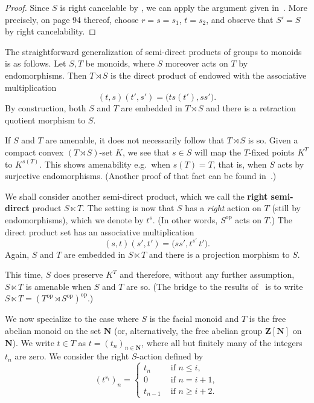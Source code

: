 \documentclass[12pt, pdflatex]{amsart}
\theoremstyle{definition}
\numberwithin{equation}{section}
\numberwithin{theorem}{section}
\newcommand{\NN}{\mathbf{N}}
\newcommand{\ZZ}{\mathbf{Z}}
\begin{document}
\begin{proof}
Since $S$ is right cancelable by , we can apply the argument given in~\cite[Thm.~2.2]{Klawe77}. More precisely, on page 94 thereof, choose $r=s=s_1$, $t=s_2$, and observe that $S'=S$ by right cancelability.
\end{proof}

The straightforward generalization of semi-direct products of groups to monoids is as follows. Let $S,T$ be monoids, where $S$ moreover acts on $T$ by endomorphisms. Then $T\rtimes S$ is the direct product of endowed with the associative multiplication
\begin{equation*}
(t, s) (t', s') = \big(t s(t'), s s'\big).
\end{equation*}
By construction, both $S$ and $T$ are embedded in $T\rtimes S$ and there is a retraction quotient morphism to $S$.

If $S$ and $T$ are amenable, it does not necessarily follow that $T\rtimes S$ is so. Given a compact convex $(T\rtimes S)$-set $K$, we see that $s\in S$ will map the $T$-fixed points $K^T$ to $K^{s(T)}$. This shows amenability e.g.\ when $s(T)=T$, that is, when $S$ acts by surjective endomorphisms. (Another proof of that fact can be found in~\cite{Klawe77}.)

We shall consider another semi-direct product, which we call the \textbf{right semi-direct} product $S \ltimes T$. The setting is now that $S$ has a \emph{right} action on $T$ (still by endomorphisms), which we denote by $t^s$. (In other words, $S^\mathrm{op}$ acts on $T$.) The direct product set has an associative multiplication
\begin{equation*}
(s, t) (s', t') = \big(s s',  t^{s'} \, t'\big).
\end{equation*}
Again, $S$ and $T$ are embedded in $S \ltimes T$ and there is a projection morphism to $S$.

This time, $S$ does preserve $K^T$ and therefore, without any further assumption, $S \ltimes T$ is amenable when $S$ and $T$ are so. (The bridge to the results of~\cite{Klawe77} is to write $S \ltimes T=(T^\mathrm{op} \rtimes S^\mathrm{op})^\mathrm{op}$.)

\medskip

We now specialize to the case where $S$ is the facial monoid and $T$ is the free abelian monoid on the set $\NN$ (or, alternatively, the free abelian group $\ZZ[\NN]$ on $\NN$). We write $t\in T$ as $t=(t_n)_{n\in\NN}$, where all but finitely many of the integers $t_n$ are zero. We consider the right $S$-action defined by
\begin{equation*}
  (t^{s_i})_n = 
    \begin{cases}
        t_n &\text{ if } n\leq i, \\
        0 &\text{ if } n = i+1, \\
         t_{n-1} &\text{ if } n\geq i+2.
    \end{cases}
\end{equation*}
\end{document}

